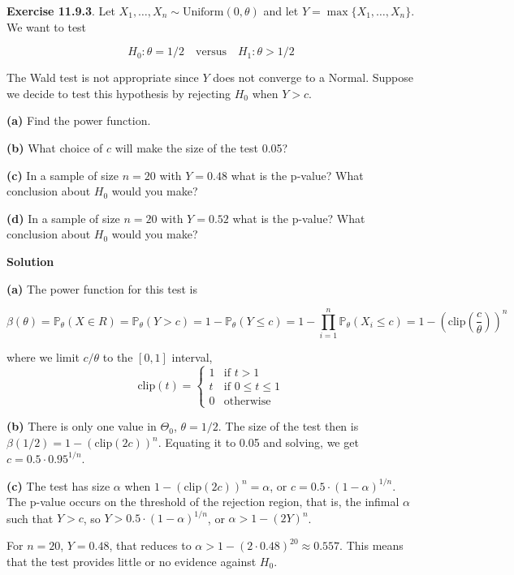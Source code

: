 \textbf{Exercise 11.9.3}. Let
\(X_{1}, \dots, X_{n} \sim \text{Uniform}(0, \theta)\) and let
\(Y = \max \{ X_{1}, \dots, X_{n} \}\). We want to test

\[ H_{0}: \theta = 1/2 \quad \text{versus} \quad H_{1}: \theta > 1/2 \]

The Wald test is not appropriate since \(Y\) does not converge to a
Normal. Suppose we decide to test this hypothesis by rejecting \(H_{0}\)
when \(Y > c\).

\textbf{(a)} Find the power function.

\textbf{(b)} What choice of \(c\) will make the size of the test 0.05?

\textbf{(c)} In a sample of size \(n = 20\) with \(Y = 0.48\) what is
the p-value? What conclusion about \(H_{0}\) would you make?

\textbf{(d)} In a sample of size \(n = 20\) with \(Y = 0.52\) what is
the p-value? What conclusion about \(H_{0}\) would you make?

\textbf{Solution}

\textbf{(a)} The power function for this test is

\[\beta(\theta) = \mathbb{P}_\theta(X \in R) = \mathbb{P}_\theta(Y > c) = 1 - \mathbb{P}_\theta(Y \leq c) = 1 - \prod_{i=1}^{n} \mathbb{P}_\theta(X_{i} \leq c) = 1 - \left(\text{clip}\left(\frac{c}{\theta}\right)\right)^{n}\]

where we limit \(c/\theta\) to the \([0, 1]\) interval,
\[\text{clip}(t) = \begin{cases} 1 & \text{if } t > 1 \\ t & \text{if } 0 \leq t \leq 1 \\ 0 & \text{otherwise} \end{cases}\]

\textbf{(b)} There is only one value in \(\Theta_{0}\), \(\theta = 1/2\).
The size of the test then is
\(\beta(1/2) = 1 - \left(\text{clip}\left(2c\right)\right)^{n}\). Equating
it to 0.05 and solving, we get \(c = 0.5 \cdot 0.95^{1/n}\).

\textbf{(c)} The test has size \(\alpha\) when $ 1 -
\left(\text{clip}\left(2c\right)\right)^{n} = \alpha$, or
\(c = 0.5 \cdot (1 - \alpha)^{1/n}\). The p-value occurs on the
threshold of the rejection region, that is, the infimal \(\alpha\) such
that \(Y > c\), so \(Y > 0.5 \cdot (1 - \alpha)^{1/n}\), or
\(\alpha > 1 - (2Y)^{n}\).

For \(n = 20\), \(Y = 0.48\), that reduces to
\(\alpha > 1 - (2\cdot 0.48)^{20} \approx 0.557\). This means that the
test provides little or no evidence against \(H_{0}\).

